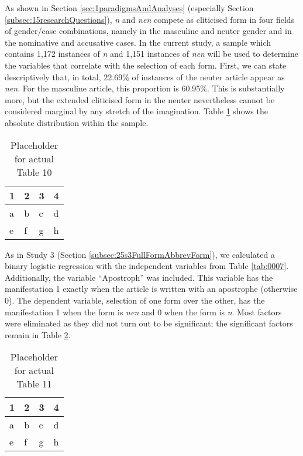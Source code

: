 As shown in Section \ref{sec:1paradigmsAndAnalyses} (especially Section \ref{subsec:15researchQuestions}), \textit{n} and \textit{nen} compete as cliticised form in four fields of gender/case combinations, namely in the masculine and neuter gender and in the nominative and accusative cases.
In the current study, a sample which contains 1,172 instances of \textit{n} and 1,151 instances of \textit{nen} will be used to determine the variables that correlate with the selection of each form.
First, we can state descriptively that, in total, 22.69\% of instances of the neuter article appear as \textit{nen}.
For the masculine article, this proportion is 60.95\%.
This is substantially more, but the extended cliticised form in the neuter nevertheless cannot be considered marginal by any stretch of the imagination.
Table \ref{tab:0010} shows the absolute distribution within the sample.

\begin{table}
	\centering
	\begin{tabular}{llll}
		\toprule
		\textbf{1} & \textbf{2} & \textbf{3} & \textbf{4} \\
		\midrule
		a & b & c & d \\
		e & f & g & h \\
		\bottomrule
	\end{tabular}
	\caption{Placeholder for actual Table 10}
	\label{tab:0010}
\end{table}

As in Study 3 (Section \ref{subsec:25s3FullFormAbbrevForm}), we calculated a binary logistic regression with the independent variables from Table \ref{tab:0007}.
Additionally, the variable ``Apostroph'' was included.
This variable has the manifestation 1 exactly when the article is written with an apostrophe (otherwise 0).
The dependent variable, selection of one form over the other, has the manifestation 1 when the form is \textit{nen} and 0 when the form is \textit{n}.
Most factors were eliminated as they did not turn out to be significant; the significant factors remain in Table \ref{tab:0011}.

\begin{table}
	\centering
	\begin{tabular}{llll}
		\toprule
		\textbf{1} & \textbf{2} & \textbf{3} & \textbf{4} \\
		\midrule
		a & b & c & d \\
		e & f & g & h \\
		\bottomrule
	\end{tabular}
	\caption{Placeholder for actual Table 11}
	\label{tab:0011}
\end{table}

